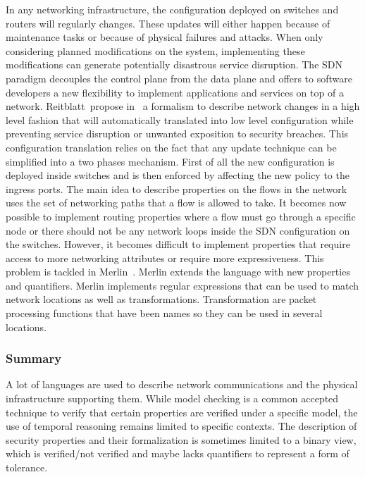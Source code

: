 In any networking infrastructure, the configuration deployed on switches and routers will regularly changes. These updates will either happen because of maintenance tasks or because of physical failures and attacks.
When only considering planned modifications on the system, implementing these modifications can generate potentially disastrous service disruption.
The SDN paradigm decouples the control plane from the data plane and offers to software developers a new flexibility to implement applications and services on top of a network.
Reitblatt~\etal propose in~\cite{abstraction-reitblatt2012} a formalism to describe network changes in a high level fashion that will automatically translated into low level configuration while preventing service disruption or unwanted exposition to security breaches.
This configuration translation relies on the fact that any update technique can be simplified into a two phases mechanism. First of all the new configuration is deployed inside switches and is then enforced by affecting the new policy to the ingress ports.
The main idea to describe properties on the flows in the network uses the set of networking paths that a flow is allowed to take.
It becomes now possible to implement routing properties where a flow must go through a specific node or there should not be any network loops inside the SDN configuration on the switches.
However, it becomes difficult to implement properties that require access to more networking attributes or require more expressiveness. This problem is tackled in Merlin~\cite{Merlin-Soule2013}.
Merlin extends the language with new properties and quantifiers.
Merlin implements regular expressions that can be used to match network locations as well as transformations.
Transformation are packet processing functions that have been names so they can be used in several locations.

\subsubsection{Summary}

A lot of languages are used to describe network communications and the physical infrastructure supporting them. While model checking is a common accepted technique to verify that certain properties are verified under a specific model, the use of temporal reasoning remains limited to specific contexts.
The description of security properties and their formalization is sometimes limited to a binary view, which is verified/not verified and maybe lacks quantifiers to represent a form of tolerance.

